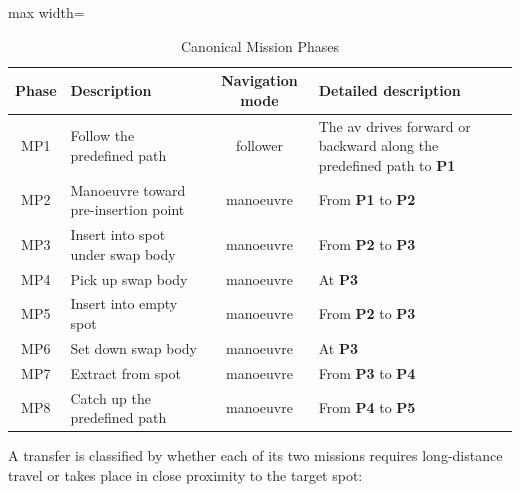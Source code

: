 \begin{table}[H]
  \centering
  \caption{Canonical Mission Phases}
  \label{tab:mission-phases}
  \begin{adjustbox}{max width=\textwidth}
    \begin{tabular}{|c|p{4.3cm}|c|p{5.8cm}|}
      \hline
      \textbf{Phase} & \textbf{Description} & \textbf{Navigation mode} & \textbf{Detailed description} \\
      \hline
      MP1 & Follow the predefined path & follower & The \gls{av} drives forward or backward along the predefined path to \textbf{P1} \\
      \hline
      MP2 & Manoeuvre toward pre-insertion point & manoeuvre & From \textbf{P1} to \textbf{P2} \\
      \hline
      MP3 & Insert into spot under swap body & manoeuvre & From \textbf{P2} to \textbf{P3} \\
      \hline
      MP4 & Pick up swap body & manoeuvre & At \textbf{P3} \\
      \hline
      MP5 & Insert into empty spot & manoeuvre & From \textbf{P2} to \textbf{P3} \\
      \hline
      MP6 & Set down swap body & manoeuvre & At \textbf{P3} \\
      \hline
      MP7 & Extract from spot & manoeuvre & From \textbf{P3} to \textbf{P4} \\
      \hline
      MP8 & Catch up the predefined path & manoeuvre & From \textbf{P4} to \textbf{P5} \\
      \hline
    \end{tabular}
  \end{adjustbox}
\end{table}

A transfer is classified by whether each of its two missions requires long-distance travel or takes place in close proximity to the target spot:

